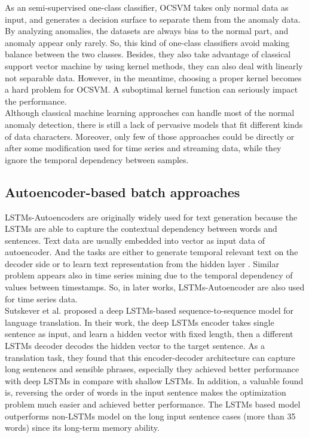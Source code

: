 As an semi-supervised one-class classifier, OCSVM takes only normal data as input, and generates a decision surface to separate them from the anomaly data. By analyzing anomalies, the datasets are always bias to the normal part, and anomaly appear only rarely. So, this kind of one-class classifiers avoid making balance between the two classes. Besides, they also take advantage of classical support vector machine by using kernel methods, they can also deal with linearly not separable data. However, in the meantime, choosing a proper kernel becomes a hard problem for OCSVM. A suboptimal kernel function can seriously impact the performance.\\

Although classical machine learning approaches can handle most of the normal anomaly detection, there is still a lack of pervasive models that fit different kinds of data characters. Moreover, only few of those approaches could be directly or after some modification used for time series and streaming data, while they ignore the temporal dependency between samples.



\subsection{Autoencoder-based batch approaches}
\label{sec:Autoencoder-based batch approaches}

LSTMs-Autoencoders are originally widely used for text generation because the LSTMs are able to capture the contextual dependency between words and sentences. Text data are usually embedded into vector as input data of autoencoder. And the tasks are either to generate temporal relevant text on the decoder side or to learn text representation from the hidden layer \cite{phraserepresentation}. Similar problem appears also in time series mining due to the temporal dependency of values between timestamps. So, in later works, LSTMs-Autoencoder are also used for time series data.\\

Sutskever et al. \cite{seq2seq} proposed a deep LSTMs-based sequence-to-sequence model for language translation. In their work, the deep LSTMs encoder takes single sentence as input, and learn a hidden vector with fixed length, then a different LSTMs decoder decodes the hidden vector to the target sentence.  As a translation task, they found that this encoder-decoder architecture can capture long sentences and sensible phrases, especially they achieved better performance with deep LSTMs in compare with shallow LSTMs. In addition, a valuable found is, reversing the order of words in the input sentence makes the optimization problem much easier and achieved better performance. The LSTMs based model outperforms non-LSTMs model on the long input sentence cases (more than 35 words) since its long-term memory ability.\\

